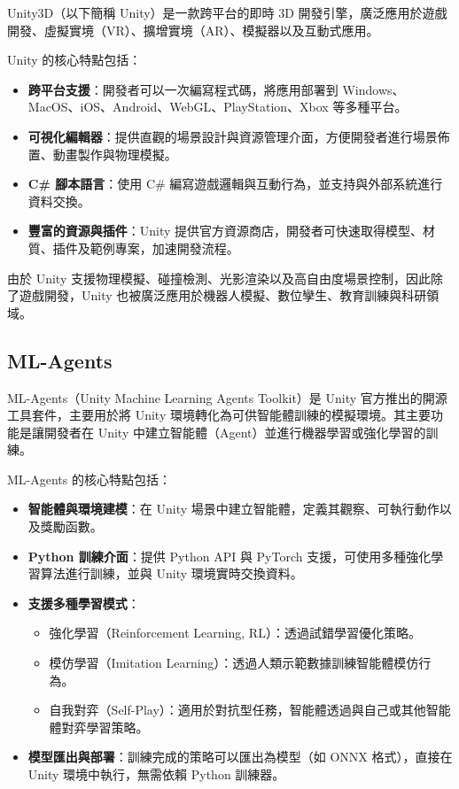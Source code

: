 \documentclass[12pt,a4paper]{ctexart}
\begin{document}
Unity3D（以下簡稱 Unity）是一款跨平台的即時 3D 開發引擎，廣泛應用於遊戲開發、虛擬實境（VR）、擴增實境（AR）、模擬器以及互動式應用。

Unity 的核心特點包括：

\begin{itemize}
    \item \textbf{跨平台支援}：開發者可以一次編寫程式碼，將應用部署到 Windows、MacOS、iOS、Android、WebGL、PlayStation、Xbox 等多種平台。
    \item \textbf{可視化編輯器}：提供直觀的場景設計與資源管理介面，方便開發者進行場景佈置、動畫製作與物理模擬。
    \item \textbf{C\# 腳本語言}：使用 C\# 編寫遊戲邏輯與互動行為，並支持與外部系統進行資料交換。
    \item \textbf{豐富的資源與插件}：Unity 提供官方資源商店，開發者可快速取得模型、材質、插件及範例專案，加速開發流程。
\end{itemize}

由於 Unity 支援物理模擬、碰撞檢測、光影渲染以及高自由度場景控制，因此除了遊戲開發，Unity 也被廣泛應用於機器人模擬、數位孿生、教育訓練與科研領域。



\subsection{ML-Agents}
ML-Agents（Unity Machine Learning Agents Toolkit）是 Unity 官方推出的開源工具套件，主要用於將 Unity 環境轉化為可供智能體訓練的模擬環境。其主要功能是讓開發者在 Unity 中建立智能體（Agent）並進行機器學習或強化學習的訓練。
\\ \par
ML-Agents 的核心特點包括：

\begin{itemize}
	\item \textbf{智能體與環境建模}：在 Unity 場景中建立智能體，定義其觀察、可執行動作以及獎勵函數。
	
	\item \textbf{Python 訓練介面}：提供 Python API 與 PyTorch 支援，可使用多種強化學習算法進行訓練，並與 Unity 環境實時交換資料。
	
	\item \textbf{支援多種學習模式}：
	
	\begin{itemize}
	\item 強化學習（Reinforcement Learning, RL）：透過試錯學習優化策略。
	
	\item 模仿學習（Imitation Learning）：透過人類示範數據訓練智能體模仿行為。
	
	\item 自我對弈（Self-Play）：適用於對抗型任務，智能體透過與自己或其他智能體對弈學習策略。
	\end{itemize}	

	\item \textbf{模型匯出與部署}：訓練完成的策略可以匯出為模型（如 ONNX 格式），直接在 Unity 環境中執行，無需依賴 Python 訓練器。
\end{itemize}
\end{document}
